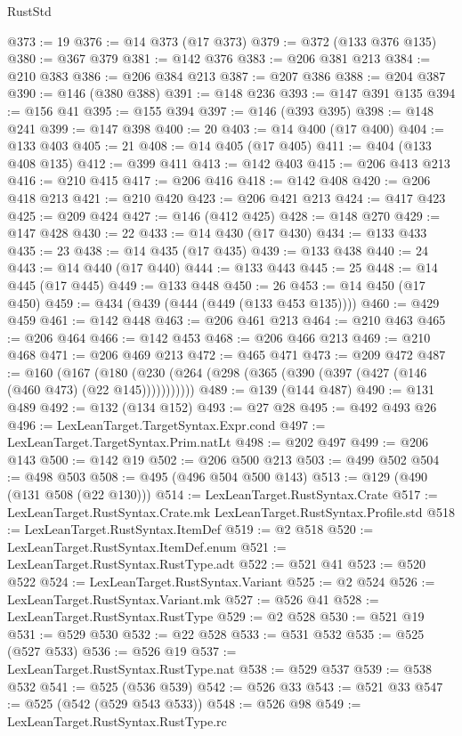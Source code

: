 \begin{lexlean}{RustStd}
\begin{coremodule}
@373 := 19
@376 := @14 @373 (@17 @373)
@379 := @372 (@133 @376 @135)
@380 := @367 @379
@381 := @142 @376
@383 := @206 @381 @213
@384 := @210 @383
@386 := @206 @384 @213
@387 := @207 @386
@388 := @204 @387
@390 := @146 (@380 @388)
@391 := @148 @236
@393 := @147 @391 @135
@394 := @156 @41
@395 := @155 @394
@397 := @146 (@393 @395)
@398 := @148 @241
@399 := @147 @398
@400 := 20
@403 := @14 @400 (@17 @400)
@404 := @133 @403
@405 := 21
@408 := @14 @405 (@17 @405)
@411 := @404 (@133 @408 @135)
@412 := @399 @411
@413 := @142 @403
@415 := @206 @413 @213
@416 := @210 @415
@417 := @206 @416
@418 := @142 @408
@420 := @206 @418 @213
@421 := @210 @420
@423 := @206 @421 @213
@424 := @417 @423
@425 := @209 @424
@427 := @146 (@412 @425)
@428 := @148 @270
@429 := @147 @428
@430 := 22
@433 := @14 @430 (@17 @430)
@434 := @133 @433
@435 := 23
@438 := @14 @435 (@17 @435)
@439 := @133 @438
@440 := 24
@443 := @14 @440 (@17 @440)
@444 := @133 @443
@445 := 25
@448 := @14 @445 (@17 @445)
@449 := @133 @448
@450 := 26
@453 := @14 @450 (@17 @450)
@459 := @434 (@439 (@444 (@449 (@133 @453 @135))))
@460 := @429 @459
@461 := @142 @448
@463 := @206 @461 @213
@464 := @210 @463
@465 := @206 @464
@466 := @142 @453
@468 := @206 @466 @213
@469 := @210 @468
@471 := @206 @469 @213
@472 := @465 @471
@473 := @209 @472
@487 := @160
    (@167 (@180 (@230 (@264 (@298 (@365 (@390 (@397 (@427 (@146 (@460 @473) (@22 @145)))))))))))
@489 := @139 (@144 @487)
@490 := @131 @489
@492 := @132 (@134 @152)
@493 := @27 @28
@495 := @492 @493 @26
@496 := LexLeanTarget.TargetSyntax.Expr.cond
@497 := LexLeanTarget.TargetSyntax.Prim.natLt
@498 := @202 @497
@499 := @206 @143
@500 := @142 @19
@502 := @206 @500 @213
@503 := @499 @502
@504 := @498 @503
@508 := @495 (@496 @504 @500 @143)
@513 := @129 (@490 (@131 @508 (@22 @130)))
@514 := LexLeanTarget.RustSyntax.Crate
@517 := LexLeanTarget.RustSyntax.Crate.mk LexLeanTarget.RustSyntax.Profile.std
@518 := LexLeanTarget.RustSyntax.ItemDef
@519 := @2 @518
@520 := LexLeanTarget.RustSyntax.ItemDef.enum
@521 := LexLeanTarget.RustSyntax.RustType.adt
@522 := @521 @41
@523 := @520 @522
@524 := LexLeanTarget.RustSyntax.Variant
@525 := @2 @524
@526 := LexLeanTarget.RustSyntax.Variant.mk
@527 := @526 @41
@528 := LexLeanTarget.RustSyntax.RustType
@529 := @2 @528
@530 := @521 @19
@531 := @529 @530
@532 := @22 @528
@533 := @531 @532
@535 := @525 (@527 @533)
@536 := @526 @19
@537 := LexLeanTarget.RustSyntax.RustType.nat
@538 := @529 @537
@539 := @538 @532
@541 := @525 (@536 @539)
@542 := @526 @33
@543 := @521 @33
@547 := @525 (@542 (@529 @543 @533))
@548 := @526 @98
@549 := LexLeanTarget.RustSyntax.RustType.rc

\end{coremodule}
\end{lexlean}
